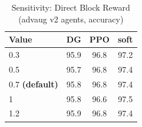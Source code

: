\begin{table}[h]
\centering
\caption{Sensitivity: Direct Block Reward (advaug v2 agents, accuracy)}
\label{tab:sensitivity_reward_direct_block_bot}
\begin{tabular}{lccc}
\toprule
Value & DG & PPO & soft \\
\midrule
  0.3 & 95.9 & 96.8 & 97.2 \\
  0.5 & 95.7 & 96.8 & 97.4 \\
  0.7 \textbf{(default)} & 95.8 & 96.8 & 97.4 \\
  1 & 95.8 & 96.6 & 97.5 \\
  1.2 & 95.9 & 96.8 & 97.4 \\
\bottomrule
\end{tabular}
\end{table}